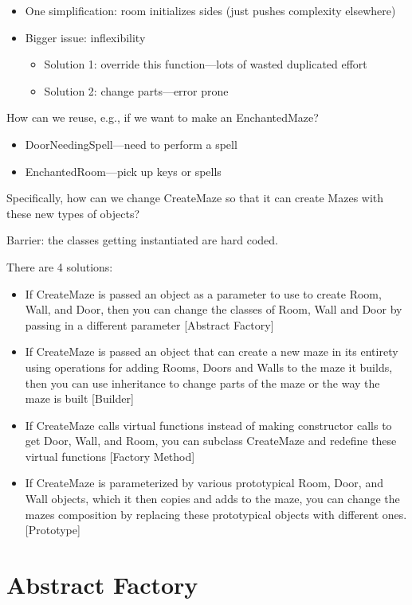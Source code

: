 \documentclass[11pt]{report}
\begin{document}
\begin{itemize}
\item One simplification: room initializes sides (just pushes complexity elsewhere)
\item Bigger issue: inflexibility
\begin{itemize}
\item Solution 1: override this function---lots of wasted duplicated effort
\item Solution 2: change parts---error prone
\end{itemize}
\end{itemize}
How can we reuse, e.g., if we want to make an EnchantedMaze?
\begin{itemize}
\item DoorNeedingSpell---need to perform a spell
\item EnchantedRoom---pick up keys or spells
\end{itemize}

Specifically, how can we change CreateMaze so that it can create Mazes with these new types of objects?

Barrier: the classes getting instantiated are hard coded.

There are 4 solutions:
\begin{itemize}
\item If CreateMaze is passed an object as a parameter to use to create Room, Wall, and Door, then you can change
the classes of Room, Wall and Door by passing in a different parameter [Abstract Factory]
\item If CreateMaze is passed an object that can create a new maze in its entirety using operations
for adding Rooms, Doors and Walls to the maze it builds, then you can use inheritance
to change  parts of the maze or the way the maze is built [Builder]
\item If CreateMaze calls virtual functions instead of making constructor calls to get Door, Wall, and Room,
you can subclass CreateMaze and redefine these virtual functions [Factory Method]
\item If CreateMaze is parameterized by various prototypical Room, Door, and Wall objects, which it then copies
and adds to the maze, you can change the mazes composition by replacing these prototypical objects with different
ones. [Prototype]
\end{itemize}

\section{Abstract Factory}
\end{document}
